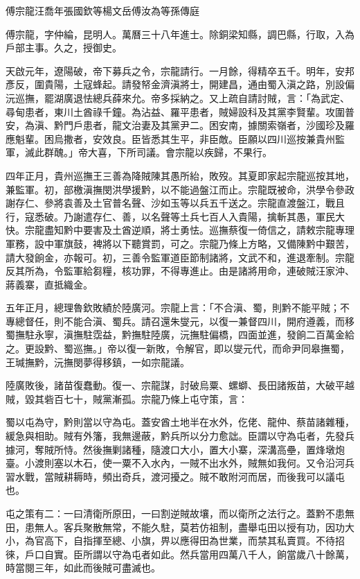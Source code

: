 
\begin{pinyinscope}
傅宗龍汪喬年張國欽等楊文岳傅汝為等孫傳庭

傅宗龍，字仲綸，昆明人。萬曆三十八年進士。除銅梁知縣，調巴縣，行取，入為戶部主事。久之，授御史。

天啟元年，遼陽破，帝下募兵之令，宗龍請行。一月餘，得精卒五千。明年，安邦彥反，圍貴陽，土寇蜂起。請發帑金濟滇將士，開建昌，通由蜀入滇之路，別設偏沅巡撫，罷湖廣退怯總兵薛來允。帝多採納之。又上疏自請討賊，言：「為武定、尋甸患者，東川土酋祿千鐘。為沾益、羅平患者，賊婦設科及其黨李賢輩。攻圍普安，為滇、黔門戶患者，龍文治妻及其黨尹二。困安南，據關索嶺者，沙國珍及羅應魁輩。困烏撒者，安效良。臣皆悉其生平，非臣敵。臣願以四川巡按兼貴州監軍，滅此群醜。」帝大喜，下所司議。會宗龍以疾歸，不果行。

四年正月，貴州巡撫王三善為降賊陳其愚所紿，敗歿。其夏即家起宗龍巡按其地，兼監軍。初，部檄滇撫閔洪學援黔，以不能過盤江而止。宗龍既被命，洪學令參政謝存仁、參將袁善及土官普名聲、沙如玉等以兵五千送之。宗龍直渡盤江，戰且行，寇悉破。乃謝遣存仁、善，以名聲等土兵七百人入貴陽，擒斬其愚，軍民大快。宗龍盡知黔中要害及土酋逆順，將士勇怯。巡撫蔡復一倚信之，請敕宗龍專理軍務，設中軍旗鼓，裨將以下聽賞罰，可之。宗龍乃條上方略，又備陳黔中艱苦，請大發餉金，亦報可。初，三善令監軍道臣節制諸將，文武不和，進退牽制。宗龍反其所為，令監軍給芻糧，核功罪，不得專進止。由是諸將用命，連破賊汪家沖、蔣義寨，直抵織金。

五年正月，總理魯欽敗績於陸廣河。宗龍上言：「不合滇、蜀，則黔不能平賊；不專總督任，則不能合滇、蜀兵。請召還朱燮元，以復一兼督四川，開府遵義，而移蜀撫駐永寧，滇撫駐霑益，黔撫駐陸廣，沅撫駐偏橋，四面並進，發餉二百萬金給之。更設黔、蜀巡撫。」帝以復一新敗，令解官，即以燮元代，而命尹同皋撫蜀，王瑊撫黔，沅撫閔夢得移鎮，一如宗龍議。

陸廣敗後，諸苗復蠢動。復一、宗龍謀，討破烏粟、螺螄、長田諸叛苗，大破平越賊，毀其砦百七十，賊黨漸孤。宗龍乃條上屯守策，言：

蜀以屯為守，黔則當以守為屯。蓋安酋土地半在水外，仡佬、龍仲、蔡苗諸雜種，緩急與相助。賊有外籓，我無邊蔽，黔兵所以分力愈詘。臣謂以守為屯者，先發兵據河，奪賊所恃。然後撫剿諸種，隨渡口大小，置大小寨，深溝高壘，置烽墩炮臺。小渡則塞以木石，使一粟不入水內，一賊不出水外，賊無如我何。又令沿河兵習水戰，當賊耕耨時，頻出奇兵，渡河擾之。賊不敢附河而居，而後我可以議屯也。

屯之策有二：一曰清衛所原田，一曰割逆賊故壤，而以衛所之法行之。蓋黔不患無田，患無人。客兵聚散無常，不能久駐，莫若仿祖制，盡舉屯田以授有功，因功大小，為官高下，自指揮至總、小旗，畀以應得田為世業，而禁其私賣買。不待招徠，戶口自實。臣所謂以守為屯者如此。然兵當用四萬八千人，餉當歲八十餘萬，時當閱三年，如此而後賊可盡滅也。


\end{pinyinscope}
